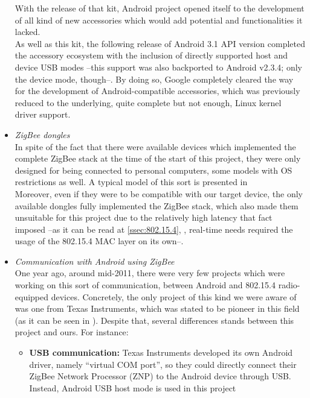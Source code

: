\begin{itemize}
				With the release of that kit, Android project opened itself to the development
				of all kind of new accessories which would add potential and functionalities
				it lacked.\\

				As well as this kit, the following release of Android 3.1 API version completed
				the accessory ecosystem with the inclusion of directly supported host and device
				USB modes --this support was also backported to Android v2.3.4; only the device mode, though--.
				By doing so, Google completely cleared the way for the development of Android-compatible accessories, 
				which was previously reduced to the underlying, quite complete but not enough, Linux kernel driver 
				support.\\
			\item \emph{ZigBee dongles}\\
				In spite of the fact that there were available devices which implemented the complete ZigBee
				stack at the time of the start of this project, they were only designed for being connected to
				personal computers, some models with OS restrictions as well. A typical model of this sort is
				presented in \cite{dongle}\\
				Moreover, even if they were to be compatible with our target device, the only available dongles
				fully implemented the ZigBee stack, which also made them unsuitable for this project due to the
				relatively high latency that fact imposed --as it can be read at \autoref{ssec:802.15.4},
				, real-time needs required the usage of the 802.15.4 MAC layer on
				its own--.
			\item \emph{Communication with Android using ZigBee}\\
				One year ago, around mid-2011, there were very few projects which were working on this sort of
				communication, between Android and 802.15.4 radio-equipped devices. Concretely, the only project
				of this kind we were aware of was one from Texas Instruments, which was stated to be pioneer in 
				this field (as it can be seen in \cite{articleTI}).
				Despite that, several differences stands between this project and ours. For instance:
				\begin{itemize}
					\item \textbf{USB communication:} Texas Instruments developed its own Android driver, namely
						``virtual COM port'', so they could directly connect their ZigBee Network Processor (ZNP)
						to the Android device through USB. Instead, Android USB host mode is used in this project

\end{itemize}
\end{itemize}
